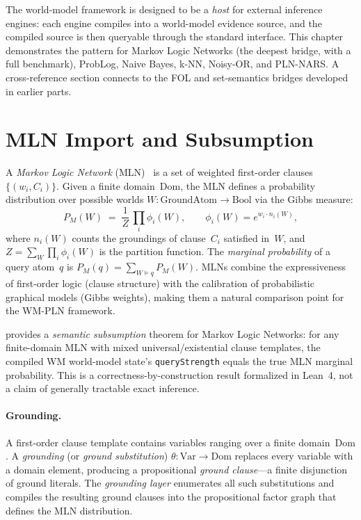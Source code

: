 \documentclass[11pt,openany]{report}
\begin{document}
The world-model framework is designed to be a \emph{host} for external
inference engines: each engine compiles into a world-model evidence
source, and the compiled source is then queryable through the standard
interface.  This chapter demonstrates the pattern for Markov Logic
Networks (the deepest bridge, with a full benchmark), ProbLog, Naive
Bayes, k-NN, Noisy-OR, and PLN-NARS.  A cross-reference section
connects to the FOL and set-semantics bridges developed in earlier
parts.
\section{MLN Import and Subsumption}
\label{sec:mln-subsumption}

A \emph{Markov Logic Network}
(MLN)~\cite{RichardsonDomingos2006} is a set of weighted first-order
clauses $\{(w_i, C_i)\}$.  Given a finite domain~$\mathrm{Dom}$, the
MLN defines a probability distribution over possible worlds
$W : \mathrm{GroundAtom} \to \mathrm{Bool}$ via the Gibbs measure:
\[
  P_M(W) \;=\; \frac{1}{Z}\,\prod_i \phi_i(W),
  \qquad
  \phi_i(W) = e^{w_i \cdot n_i(W)},
\]
where $n_i(W)$ counts the groundings of clause~$C_i$ satisfied in~$W$,
and $Z = \sum_W \prod_i \phi_i(W)$ is the partition function.  The
\emph{marginal probability} of a query atom~$q$ is
$P_M(q) = \sum_{W \models q} P_M(W)$.  MLNs combine the expressiveness
of first-order logic (clause structure) with the calibration of
probabilistic graphical models (Gibbs weights), making them a natural
comparison point for the WM-PLN framework.

\xiPLN{} provides a \emph{semantic subsumption} theorem for Markov Logic
Networks: for any finite-domain MLN with mixed universal/existential
clause templates, the compiled WM world-model state's
\texttt{queryStrength} equals the true MLN marginal probability.  This is
a correctness-by-construction result formalized in Lean~4, not a claim of
generally tractable exact inference.

\paragraph{Grounding.}
A first-order clause template contains variables ranging over a finite
domain~$\mathrm{Dom}$.  A \emph{grounding} (or \emph{ground
substitution}) $\theta : \mathrm{Var} \to \mathrm{Dom}$ replaces every
variable with a domain element, producing a propositional \emph{ground
clause}---a finite disjunction of ground literals.  The
\emph{grounding layer} enumerates all such substitutions and compiles
the resulting ground clauses into the propositional factor graph that
defines the MLN distribution.
\end{document}
